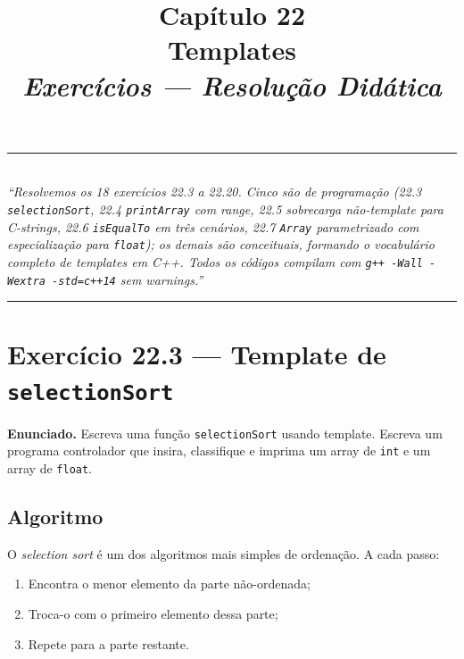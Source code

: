 \documentclass[11pt,a4paper]{article}
\title{
  \vspace{-1cm}
  {\Huge\bfseries\color{deitelblue} Cap\'itulo 22}\\[0.3em]
  {\Large\bfseries Templates}\\[0.8em]
  {\large\itshape Exerc\'icios --- Resolu\c{c}\~ao Did\'atica}
}
\author{}
\date{}
\begin{document}
\maketitle
\thispagestyle{empty}
\vspace{-2em}

\begin{center}
\rule{0.85\textwidth}{0.5pt}\\[0.4em]
\textit{``Resolvemos os 18 exerc\'icios 22.3 a 22.20. Cinco s\~ao de programa\c{c}\~ao (22.3 \texttt{selectionSort}, 22.4 \texttt{printArray} com range, 22.5 sobrecarga n\~ao-template para C-strings, 22.6 \texttt{isEqualTo} em tr\^es cen\'arios, 22.7 \texttt{Array} parametrizado com especializa\c{c}\~ao para \texttt{float}); os demais s\~ao conceituais, formando o vocabul\'ario completo de templates em C++. Todos os c\'odigos compilam com \texttt{g++ -Wall -Wextra -std=c++14} sem warnings.''}\\[0.4em]
\rule{0.85\textwidth}{0.5pt}
\end{center}

\vspace{1em}

\section{Exerc\'icio 22.3 --- Template de \texttt{selectionSort}}

\begin{enunciado}
\textbf{Enunciado.} Escreva uma fun\c{c}\~ao \texttt{selectionSort} usando template. Escreva um programa controlador que insira, classifique e imprima um array de \texttt{int} e um array de \texttt{float}.
\end{enunciado}

\subsection*{Algoritmo}

O \emph{selection sort} \'e um dos algoritmos mais simples de ordena\c{c}\~ao. A cada passo:

\begin{enumerate}[leftmargin=*,itemsep=0pt]
  \item Encontra o menor elemento da parte n\~ao-ordenada;
  \item Troca-o com o primeiro elemento dessa parte;
  \item Repete para a parte restante.
\end{enumerate}
\end{document}
